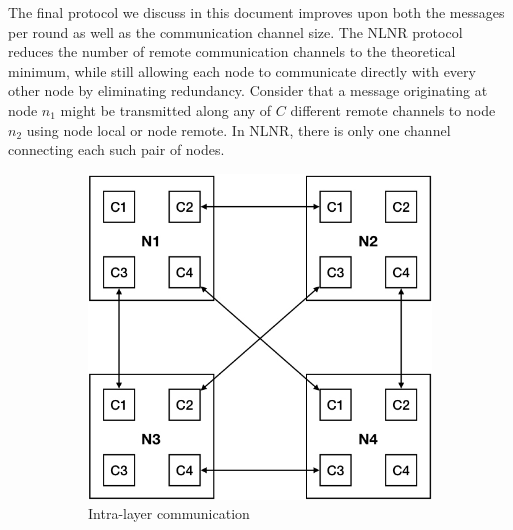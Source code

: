 \documentclass{report}
\begin{document}
The final protocol we discuss in this document improves upon both the messages per round as well as the communication channel size.
The NLNR protocol reduces the number of remote communication channels to the theoretical minimum, while still allowing each node to communicate directly with every other node by eliminating redundancy.
Consider that a message originating at node $n_1$ might be transmitted along any of $C$ different remote channels to node $n_2$ using node local or node remote.
In NLNR, there is only one channel connecting each such pair of nodes. 

\begin{figure}
	\begin{center}
		\begin{subfigure}{0.45\linewidth}
			\centerline{\includegraphics[width=1.0\columnwidth]{intra_layer_nlnr}}
			\caption{Intra-layer communication \label{fig:intra_exchange}}
		\end{subfigure}%
		\hspace{1em}%
		\begin{subfigure}{0.49\linewidth}

\end{subfigure}
\end{center}
\end{figure}
\end{document}

